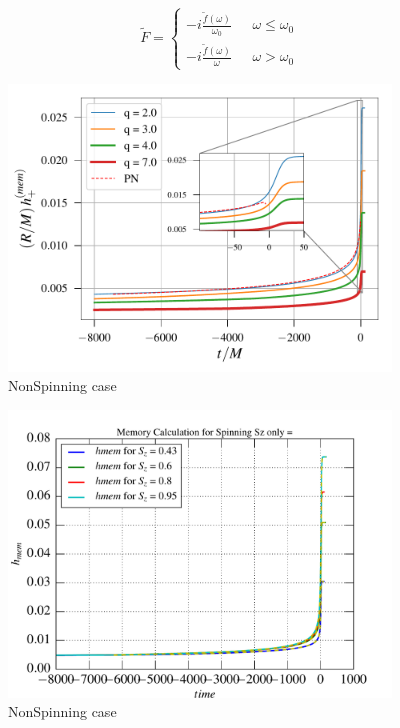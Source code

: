 \documentclass[prd,preprintnumbers,twocolumn,eqsecnum,floatfix,letter]{revtex4}
\begin{document}
\[
\tilde{F} =
\begin{cases}
-\mathit{i} \frac{\tilde{f}(\omega)}{\omega_0} & \text{ $\omega\leq\omega_0$} \\
-\mathit{i} \frac{\tilde{f}(\omega)}{\omega} & \text{ $\omega>\omega_0$} 

\end{cases}
\]
\begin{figure}
\includegraphics[width=4.0in]{../plots/MemoryPlot_nonSpining/q7.pdf}
\caption{NonSpinning case}
\label{fig:q7}
\end{figure}

\begin{figure}
\includegraphics[width=4.0in]{../plots/MemoryPlot_alignedSpin/0p95.pdf}
\caption{NonSpinning case}
\label{fig:0p95}
\end{figure}

\newpage
\appendix 



\end{document}
